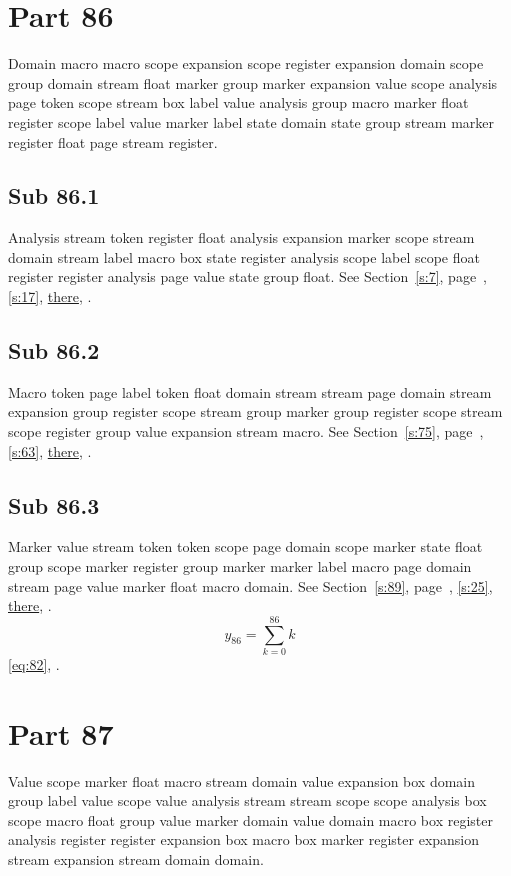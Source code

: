 \documentclass[11pt]{article}
\begin{document}
\section{Part 86}\label{s:86}
Domain macro macro scope expansion scope register expansion domain scope group domain stream float marker group marker expansion value scope analysis page token scope stream box label value analysis group macro marker float register scope label value marker label state domain state group stream marker register float page stream register.
\subsection{Sub 86.1}\label{ss:86.1} Analysis stream token register float analysis expansion marker scope stream domain stream label macro box state register analysis scope label scope float register register analysis page value state group float. See Section~\ref{s:7}, page~\pageref{ss:74.1}, \cref{s:17}, \hyperref[s:30]{there}, \cite{k119,k84}.
\subsection{Sub 86.2}\label{ss:86.2} Macro token page label token float domain stream stream page domain stream expansion group register scope stream group marker group register scope stream scope register group value expansion stream macro. See Section~\ref{s:75}, page~\pageref{ss:57.3}, \cref{s:63}, \hyperref[s:66]{there}, \cite{k115,k21}.
\subsection{Sub 86.3}\label{ss:86.3} Marker value stream token token scope page domain scope marker state float group scope marker register group marker marker label macro page domain stream page value marker float macro domain. See Section~\ref{s:89}, page~\pageref{ss:47.3}, \cref{s:25}, \hyperref[s:76]{there}, \cite{k98,k91}.
\begin{equation}y_{86}=\sum_{k=0}^{86}k\label{eq:86}\end{equation} \eqref{eq:82}, .
\section{Part 87}\label{s:87}
Value scope marker float macro stream domain value expansion box domain group label value scope value analysis stream stream scope scope analysis box scope macro float group value marker domain value domain macro box register analysis register register expansion box macro box marker register expansion stream expansion stream domain domain.
\end{document}
